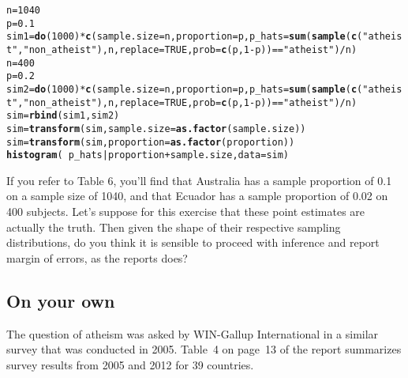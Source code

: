 \documentclass{article}\usepackage[]{graphicx}\usepackage[]{color}
\makeatletter
\newcommand{\hlnum}[1]{\textcolor[rgb]{0.686,0.059,0.569}{#1}}%
\newcommand{\hlstr}[1]{\textcolor[rgb]{0.192,0.494,0.8}{#1}}%
\newcommand{\hlopt}[1]{\textcolor[rgb]{0,0,0}{#1}}%
\newcommand{\hlstd}[1]{\textcolor[rgb]{0.345,0.345,0.345}{#1}}%
\newcommand{\hlkwb}[1]{\textcolor[rgb]{0.69,0.353,0.396}{#1}}%
\newcommand{\hlkwc}[1]{\textcolor[rgb]{0.333,0.667,0.333}{#1}}%
\newcommand{\hlkwd}[1]{\textcolor[rgb]{0.737,0.353,0.396}{\textbf{#1}}}%
\newenvironment{kframe}{%
 \def\at@end@of@kframe{}%
 \ifinner\ifhmode%
  \def\at@end@of@kframe{\end{minipage}}%
  \begin{minipage}{\columnwidth}%
 \fi\fi%
 \def\FrameCommand##1{\hskip\@totalleftmargin \hskip-\fboxsep
 \colorbox{shadecolor}{##1}\hskip-\fboxsep
     \hskip-\linewidth \hskip-\@totalleftmargin \hskip\columnwidth}%
 \MakeFramed {\advance\hsize-\width
   \@totalleftmargin\z@ \linewidth\hsize
   \@setminipage}}%
 {\par\unskip\endMakeFramed%
 \at@end@of@kframe}
\newenvironment{knitrout}{}{} %
\makeatother
\begin{document}
\begin{knitrout}
\color{fgcolor}\begin{kframe}
\begin{alltt}
\hlstd{n} \hlkwb{=} \hlnum{1040}
\hlstd{p} \hlkwb{=} \hlnum{0.1}
\hlstd{sim1} \hlkwb{=} \hlkwd{do}\hlstd{(}\hlnum{1000}\hlstd{)} \hlopt{*} \hlkwd{c}\hlstd{(}\hlkwc{sample.size} \hlstd{= n,} \hlkwc{proportion} \hlstd{= p,} \hlkwc{p_hats} \hlstd{=} \hlkwd{sum}\hlstd{(}\hlkwd{sample}\hlstd{(}\hlkwd{c}\hlstd{(}\hlstr{"atheist"}\hlstd{,} \hlstr{"non_atheist"}\hlstd{), n,} \hlkwc{replace} \hlstd{=} \hlnum{TRUE}\hlstd{,} \hlkwc{prob} \hlstd{=} \hlkwd{c}\hlstd{(p,} \hlnum{1}\hlopt{-}\hlstd{p))} \hlopt{==} \hlstr{"atheist"}\hlstd{)} \hlopt{/} \hlstd{n)}
\hlstd{n} \hlkwb{=} \hlnum{400}
\hlstd{p} \hlkwb{=} \hlnum{0.2}
\hlstd{sim2} \hlkwb{=} \hlkwd{do}\hlstd{(}\hlnum{1000}\hlstd{)} \hlopt{*} \hlkwd{c}\hlstd{(}\hlkwc{sample.size} \hlstd{= n,} \hlkwc{proportion} \hlstd{= p,} \hlkwc{p_hats} \hlstd{=} \hlkwd{sum}\hlstd{(}\hlkwd{sample}\hlstd{(}\hlkwd{c}\hlstd{(}\hlstr{"atheist"}\hlstd{,} \hlstr{"non_atheist"}\hlstd{), n,} \hlkwc{replace} \hlstd{=} \hlnum{TRUE}\hlstd{,} \hlkwc{prob} \hlstd{=} \hlkwd{c}\hlstd{(p,} \hlnum{1}\hlopt{-}\hlstd{p))} \hlopt{==} \hlstr{"atheist"}\hlstd{)} \hlopt{/} \hlstd{n)}
\hlstd{sim} \hlkwb{=} \hlkwd{rbind}\hlstd{(sim1, sim2)}
\hlstd{sim} \hlkwb{=} \hlkwd{transform}\hlstd{(sim,} \hlkwc{sample.size} \hlstd{=} \hlkwd{as.factor}\hlstd{(sample.size))}
\hlstd{sim} \hlkwb{=} \hlkwd{transform}\hlstd{(sim,} \hlkwc{proportion} \hlstd{=} \hlkwd{as.factor}\hlstd{(proportion))}
\hlkwd{histogram}\hlstd{(}\hlopt{~}\hlstd{p_hats} \hlopt{|} \hlstd{proportion} \hlopt{+} \hlstd{sample.size,} \hlkwc{data}\hlstd{=sim)}
\end{alltt}
\end{kframe}
\end{knitrout}


\begin{exercise}
If you refer to Table 6,  you'll find that Australia has a sample proportion of 0.1 on a sample size of 1040, and that Ecuador has a sample proportion of 0.02 on 400 subjects. Let's suppose for this exercise that these point estimates are actually the truth. Then given the shape of their respective sampling distributions, do you think it is sensible to proceed with inference and report margin of errors, as the reports does?
\end{exercise}

\subsection*{On your own}
The question of atheism was asked by WIN-Gallup International in a similar survey that was conducted in 2005.  Table~4 on page~13 of the report summarizes survey results from 2005 and 2012 for 39 countries.
\end{document}
